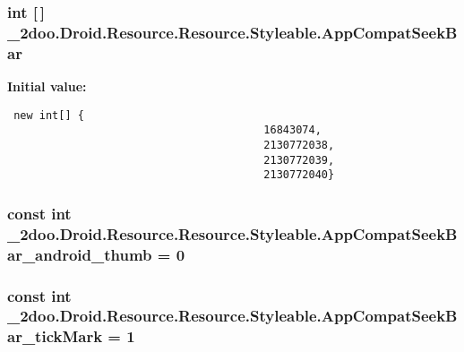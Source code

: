 \hypertarget{class__2doo_1_1_droid_1_1_resource_1_1_styleable_8cbf4e81e484786857af81c19bd5f2d1}{
\subsubsection[{AppCompatSeekBar}]{\setlength{\rightskip}{0pt plus 5cm}int \mbox{[}$\,$\mbox{]} \_\-2doo.Droid.Resource.Resource.Styleable.AppCompatSeekBar}}
\label{class__2doo_1_1_droid_1_1_resource_1_1_styleable_8cbf4e81e484786857af81c19bd5f2d1}


\textbf{Initial value:}

\begin{Code}\begin{verbatim} new int[] {
                                        16843074,
                                        2130772038,
                                        2130772039,
                                        2130772040}
\end{verbatim}
\end{Code}
\hypertarget{class__2doo_1_1_droid_1_1_resource_1_1_styleable_5af227b0195598c26ce1ee857ce681c8}{
\subsubsection[{AppCompatSeekBar\_\-android\_\-thumb}]{\setlength{\rightskip}{0pt plus 5cm}const int \_\-2doo.Droid.Resource.Resource.Styleable.AppCompatSeekBar\_\-android\_\-thumb = 0}}
\label{class__2doo_1_1_droid_1_1_resource_1_1_styleable_5af227b0195598c26ce1ee857ce681c8}


\hypertarget{class__2doo_1_1_droid_1_1_resource_1_1_styleable_122b31aff25a2112c545ea7da7a599c2}{
\subsubsection[{AppCompatSeekBar\_\-tickMark}]{\setlength{\rightskip}{0pt plus 5cm}const int \_\-2doo.Droid.Resource.Resource.Styleable.AppCompatSeekBar\_\-tickMark = 1}}
\label{class__2doo_1_1_droid_1_1_resource_1_1_styleable_122b31aff25a2112c545ea7da7a599c2}


